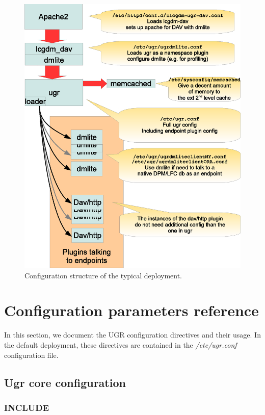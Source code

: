 \documentclass[12pt]{article} %
\begin{document}
\begin{figure}
  \begin{center}
    \includegraphics[width=30pc]{fullconfig.eps}
  \end{center}
  \caption{\label{fig_fullconfig}Configuration structure of the typical deployment.}
\end{figure}

\section{Configuration parameters reference}
In this section, we document the UGR configuration directives and their usage. In the default deployment, these directives are contained in the \textit{/etc/ugr.conf} configuration file.

\subsection{Ugr core configuration}

\subsubsection{INCLUDE}
\end{document}
